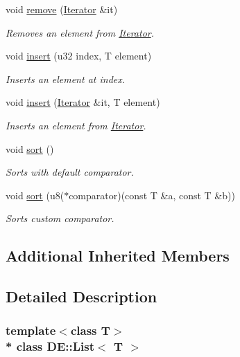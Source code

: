 \begin{DoxyCompactItemize}
void \hyperlink{classDE_1_1List_a91c378ed012e468dfdeb9796206fd70b}{remove} (\hyperlink{classDE_1_1List_1_1Iterator}{Iterator} \&it)
\begin{DoxyCompactList}\small\item\em Removes an element from \hyperlink{classDE_1_1List_1_1Iterator}{Iterator}. \end{DoxyCompactList}\item 
void \hyperlink{classDE_1_1List_a24ce2d78bf3b79b4258a153e8b5701e6}{insert} (u32 index, T element)
\begin{DoxyCompactList}\small\item\em Inserts an element at index. \end{DoxyCompactList}\item 
void \hyperlink{classDE_1_1List_a57232c3aa2cacad5458d79b04d20409b}{insert} (\hyperlink{classDE_1_1List_1_1Iterator}{Iterator} \&it, T element)
\begin{DoxyCompactList}\small\item\em Inserts an element from \hyperlink{classDE_1_1List_1_1Iterator}{Iterator}. \end{DoxyCompactList}\item 
void \hyperlink{classDE_1_1List_ac2fbbfb7910777429b31e43a003bb73c}{sort} ()\hypertarget{classDE_1_1List_ac2fbbfb7910777429b31e43a003bb73c}{}\label{classDE_1_1List_ac2fbbfb7910777429b31e43a003bb73c}

\begin{DoxyCompactList}\small\item\em Sorts with default comparator. \end{DoxyCompactList}\item 
void \hyperlink{classDE_1_1List_aca8907fcbb0da2c0f4edc43e6c83d40c}{sort} (u8($\ast$comparator)(const T \&a, const T \&b))
\begin{DoxyCompactList}\small\item\em Sorts custom comparator. \end{DoxyCompactList}\end{DoxyCompactItemize}
\subsection*{Additional Inherited Members}


\subsection{Detailed Description}
\subsubsection*{template$<$class T$>$\\*
class D\+E\+::\+List$<$ T $>$}

